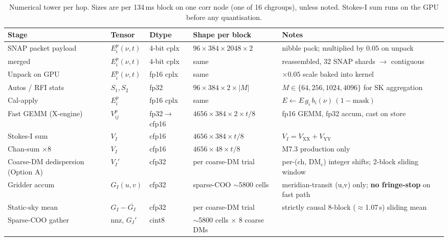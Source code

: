 \documentclass[11pt,a4paper]{article}
\newcommand{\DM}{\mathrm{DM}}
\newcommand{\codeword}[1]{\text{\ttfamily\small\detokenize{#1}}}
\begin{document}
\begin{table}[ht]
\centering
\caption{Numerical tower per hop.  Sizes are per 134\,ms block on
one corr node (one of 16 chgroups), unless noted.  Stokes-I sum
runs on the GPU before any quantisation.}
\label{tab:requant}
\small
\begin{tabular}{lllll}
\toprule
Stage & Tensor & Dtype & Shape per block & Notes \\
\midrule
SNAP packet payload      & $E_i^p(\nu,t)$ & 4-bit cplx & $96\!\times\!384\!\times\!2048\!\times\!2$ &
   nibble pack; multiplied by $0.05$ on unpack \\
\codeword{fada} merged   & $E_i^p(\nu,t)$ & 4-bit cplx & same                                      &
   reassembled, 32 SNAP shards $\rightarrow$ contiguous \\
Unpack on GPU           & $E_i^p(\nu,t)$ & fp16 cplx  & same                                      &
   $\times 0.05$ scale baked into kernel \\
Autos / RFI stats       & $S_1, S_2$    & fp32        & $96\!\times\!384\!\times\!2 \times |M|$    &
   $M\in\{64,256,1024,4096\}$ for SK aggregation \\
Cal-apply               & $E_i^p$       & fp16 cplx   & same                                      &
   $E \leftarrow E\,g_i\,b_i(\nu)\,(1-\text{mask})$ \\
Fast GEMM (X-engine)    & $V_{ij}^{p}$  & fp32$\rightarrow$cfp16 & $4656\!\times\!384\!\times\!2 \times t/8$ &
   fp16 GEMM, fp32 accum, cast on store \\
Stokes-I sum            & $V_I$         & cfp16       & $4656\!\times\!384 \times t/8$            &
   $V_I = V_\mathrm{XX}+V_\mathrm{YY}$ \\
Chan-sum $\times 8$      & $V_I$         & cfp16       & $4656\!\times\!48 \times t/8$             &
   M7.3 production only \\
Coarse-DM dedispersion (Option A) & $V_I'$  & cfp32        & per coarse-DM trial                       &
   per-(ch, $\DM_c$) integer shifts; 2-block sliding window \\
Gridder accum           & $G_I(u,v)$    & cfp32        & sparse-COO $\sim$5800 cells              &
   meridian-transit (u,v) only; \textbf{no fringe-stop} on fast path \\
Static-sky mean         & $G_I - \overline{G_I}$ & cfp32 & per coarse-DM trial & strictly causal 8-block ($\approx$1.07\,s) sliding mean \\
Sparse-COO gather       & nnz, $G_I'$   & cint8        & $\sim$5800 cells $\times$ 8 coarse DMs &

\end{tabular}
\end{table}
\end{document}
